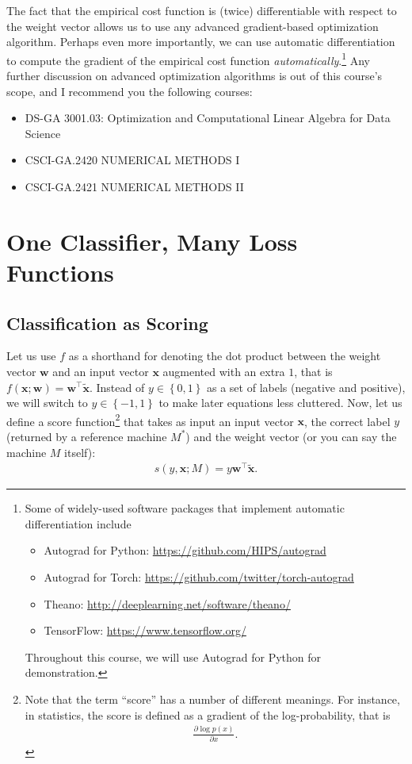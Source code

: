 \documentclass{report}
\newcommand{\vect}[1]{\mathbf{#1}}
\newcommand{\vx}[0]{\vect{x}}
\newcommand{\vw}[0]{\vect{w}}
\begin{document}
The fact that the empirical cost function is (twice) differentiable with respect
to the weight vector allows us to use any advanced gradient-based optimization
algorithm. Perhaps even more importantly, we can use automatic differentiation
to compute the gradient of the empirical cost function {\it
automatically}.\footnote{
    Some of widely-used software packages that implement automatic
    differentiation include
    \begin{itemize}
        \item Autograd for Python: \url{https://github.com/HIPS/autograd}
        \item Autograd for Torch:
            \url{https://github.com/twitter/torch-autograd}
        \item Theano: \url{http://deeplearning.net/software/theano/}
        \item TensorFlow: \url{https://www.tensorflow.org/}
    \end{itemize}
    Throughout this course, we will use Autograd for Python for demonstration.
}
Any further discussion on advanced optimization algorithms is out of this
course's scope, and I recommend you the following courses:
\begin{itemize}
    \item DS-GA 3001.03: Optimization and Computational Linear Algebra for Data
        Science
    \item CSCI-GA.2420 NUMERICAL METHODS I
    \item CSCI-GA.2421 NUMERICAL METHODS II
\end{itemize}


\section{One Classifier, Many Loss Functions}

\subsection{Classification as Scoring}

Let us use $f$ as a shorthand for denoting the dot product between the weight
vector $\vw$ and an input vector $\vx$ augmented with an extra $1$, that is
$f(\vx; \vw) = \vw^\top \tilde{\vx}$. Instead of $y \in \left\{ 0, 1\right\}$ as
a set of labels (negative and positive), we will switch to $y \in \left\{ -1,
1\right\}$ to make later equations less cluttered. Now, let us define a score
function\footnote{
    Note that the term ``score'' has a number of different meanings. For
    instance, in statistics, the score is defined as a gradient of the
    log-probability, that is
    \begin{align*}
        \frac{\partial \log p(x)}{\partial x}.
    \end{align*}
} that takes as input an input vector $\vx$, the correct label $y$ (returned by
a reference machine $M^*$) and the weight vector (or you can say the machine $M$
itself): 
\begin{align}
    \label{eq:lin_score}
    s(y, \vx; M) = y \vw^\top \tilde{\vx}.
\end{align}
\end{document}

